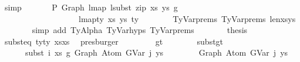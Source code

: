 \begin{isabellebody}
\ simp\isanewline
\isanewline
\ \ \ \ \isamarkupfalse%
\ {\isachardoublequoteopen}{\isasymGamma}{}\ {\isasymturnstile}{\isacharbraceleft}{\kern0pt}P{\isacharbraceright}{\kern0pt}\ Graph\ {\isacharparenleft}{\kern0pt}lmap\ {\isacharparenleft}{\kern0pt}lsubst\ {\isacharparenleft}{\kern0pt}zip\ xs\ ys{\isacharparenright}{\kern0pt}{\isacharparenright}{\kern0pt}\ g{}{\isacharparenright}{\kern0pt}\isanewline
\ \ \ \ \ \ \ \ \ \ \ \ \ \ \ \ \ \ {\isacharcolon}{\kern0pt}\ lmap{\isacharunderscore}{\kern0pt}ty\ xs\ ys\ ty{}{\isachardoublequoteclose}\isanewline
\ \ \ \ \ \ \isamarkupfalse%
\ TyVar{\isachardot}{\kern0pt}prems{\isacharparenleft}{\kern0pt}{}{\isacharparenright}{\kern0pt}\ TyVar{\isachardot}{\kern0pt}prems{\isacharparenleft}{\kern0pt}{}{\isacharparenright}{\kern0pt}\ len{\isacharunderscore}{\kern0pt}xs{\isacharunderscore}{\kern0pt}ys\isanewline
\ \ \ \ \ \ \isamarkupfalse%
\ {\isacharparenleft}{\kern0pt}simp\ add{\isacharcolon}{\kern0pt}\ TyAlpha\ TyVar{\isachardot}{\kern0pt}hyps{\isacharparenleft}{\kern0pt}{}{\isacharparenright}{\kern0pt}\ TyVar{\isachardot}{\kern0pt}prems{\isacharparenleft}{\kern0pt}{}{\isacharcomma}{\kern0pt}{}{\isacharparenright}{\kern0pt}{\isacharparenright}{\kern0pt}\isanewline
\isanewline
\ \ \ \ \isamarkupfalse%
\ \isamarkupfalse%
\ {\isacharquery}{\kern0pt}thesis\isanewline
\ \ \ \ \ \ \isamarkupfalse%
\ subst{\isacharunderscore}{\kern0pt}eq{\isacharprime}{\kern0pt}\ ty{\isacharprime}{\kern0pt}{\isacharunderscore}{\kern0pt}ty{}\ xs{\isacharprime}{\kern0pt}{\isacharunderscore}{\kern0pt}xs\ \isamarkupfalse%
\ presburger\isanewline
\ \ \isamarkupfalse%
\isanewline
\ \ \ \ \isamarkupfalse%
\ gt\ \ \isanewline
\isanewline
\ \ \ \ \isamarkupfalse%
\ subst{\isacharunderscore}{\kern0pt}gt{\isacharcolon}{\kern0pt}\isanewline
\ \ \ \ \ \ {\isachardoublequoteopen}subst\ i\ xs\ g{}\ {\isacharparenleft}{\kern0pt}Graph\ {\isacharparenleft}{\kern0pt}Atom\ {\isacharparenleft}{\kern0pt}GVar\ j{\isacharparenright}{\kern0pt}\ ys{\isacharparenright}{\kern0pt}{\isacharparenright}{\kern0pt}\isanewline
\ \ \ \ \ \ \ {\isacharequal}{\kern0pt}\ Graph\ {\isacharparenleft}{\kern0pt}Atom\ {\isacharparenleft}{\kern0pt}GVar\ j{\isacharparenright}{\kern0pt}\ ys{\isacharparenright}{\kern0pt}{\isachardoublequoteclose}\isanewline
\ \ \ \ \ \ \isamarkupfalse%

\end{isabellebody}
